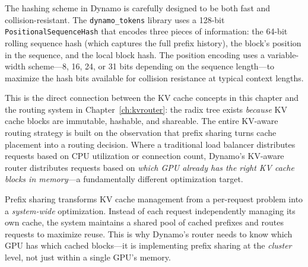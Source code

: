 The hashing scheme in Dynamo is carefully designed to be both fast and collision-resistant. The \texttt{dynamo\_tokens} library uses a 128-bit \texttt{PositionalSequenceHash} that encodes three pieces of information: the 64-bit rolling sequence hash (which captures the full prefix history), the block's position in the sequence, and the local block hash. The position encoding uses a variable-width scheme---8, 16, 24, or 31 bits depending on the sequence length---to maximize the hash bits available for collision resistance at typical context lengths.

This is the direct connection between the KV cache concepts in this chapter and the routing system in Chapter~\ref{ch:kvrouter}: the radix tree exists \emph{because} KV cache blocks are immutable, hashable, and shareable. The entire KV-aware routing strategy is built on the observation that prefix sharing turns cache placement into a routing decision. Where a traditional load balancer distributes requests based on CPU utilization or connection count, Dynamo's KV-aware router distributes requests based on \emph{which GPU already has the right KV cache blocks in memory}---a fundamentally different optimization target.

\begin{insightbox}
Prefix sharing transforms KV cache management from a per-request problem into a \emph{system-wide} optimization. Instead of each request independently managing its own cache, the system maintains a shared pool of cached prefixes and routes requests to maximize reuse. This is why Dynamo's router needs to know which GPU has which cached blocks---it is implementing prefix sharing at the \emph{cluster} level, not just within a single GPU's memory.
\end{insightbox}

